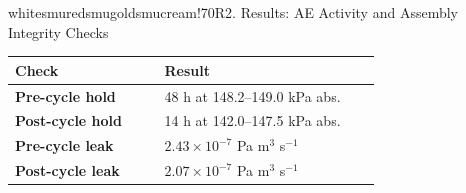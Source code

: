 \begin{posterblock}{white}{smured}{smugold}{smucream!70}{R2. Results: AE Activity and Assembly Integrity Checks}
\compacttable
\renewcommand{\arraystretch}{1.10}
\begin{tabular}{@{}>{\bfseries}p{0.36\linewidth}p{0.52\linewidth}@{}}
\toprule
Check & Result \\
\midrule
Pre-cycle hold & 48 h at 148.2--149.0 kPa abs. \\
Post-cycle hold & 14 h at 142.0--147.5 kPa abs. \\
Pre-cycle leak & $2.43\times10^{-7}$ Pa m$^3$ s$^{-1}$ \\
Post-cycle leak & $2.07\times10^{-7}$ Pa m$^3$ s$^{-1}$ \\
\bottomrule
\end{tabular}
\end{posterblock}
